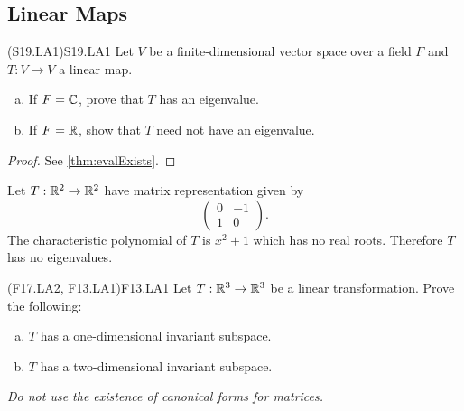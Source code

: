 \documentclass[../AlgebraQualSolutions.tex]{subfiles}
\begin{document}
\subsection{Linear Maps}

	\begin{prob}{(S19.LA1)}{S19.LA1}
		Let $V$ be a finite-dimensional vector space over a field $F$ and $T: V \to V$ a linear map.

		\begin{enumerate}[(a)]
			\item If $F = \mathbb{C}$, prove that $T$ has an eigenvalue.
			\item If $F = \mathbb{R}$, show that $T$ need not have an eigenvalue.
		\end{enumerate}

	\end{prob}

	\begin{proof}
		See \ref{thm:evalExists}.
	\end{proof}

	\begin{solution}
		Let $T: \mathbb{R}^2 \to \mathbb{R}^2$ have matrix representation given by 
			\[\begin{pmatrix} 0 & -1 \\ 1 & 0 \end{pmatrix}.\]
		The characteristic polynomial of $T$ is $x^2 + 1$ which has no real roots. Therefore $T$ has no eigenvalues.
	\end{solution}

	\begin{prob}{(F17.LA2, F13.LA1)}{F13.LA1}
		Let $T: \mathbb{R}^3 \to \mathbb{R}^3$ be a linear transformation. Prove the following:
		\begin{enumerate}[(a)]
			\item $T$ has a one-dimensional invariant subspace.
			\item $T$ has a two-dimensional invariant subspace.
		\end{enumerate}
	
		\emph{ Do not use the existence of canonical forms for matrices.}
	\end{prob}
\end{document}
